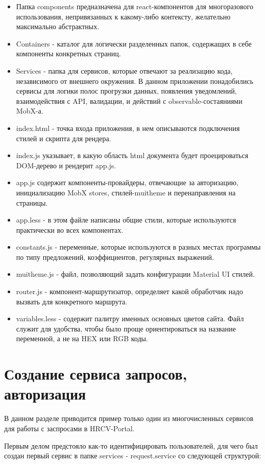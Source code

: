 \documentclass[12pt, a4paper]{diplom}
\begin{document}
\begin{itemize}
\item Папка components предназначена для react-компонентов для многоразового использования, непривязанных к какому-либо контексту, желательно максимально абстрактных.
\item Containers - каталог для логически разделенных папок, содержащих в себе компоненты конкретных страниц.
\item Services - папка для сервисов, которые отвечают за реализацию кода, независимого от внешнего окружения. В данном приложении понадобились сервисы для логики полос прогрузки данных, появления уведомлений, взаимодействия с API, валидации, и действий с observable-состаяниями MobX-а.
\item index.html - точка входа приложения, в нем описываются подключения стилей и скрипта для рендера.
\item index.js указывает, в какую область html документа будет проецироваться DOM-дерево и рендерит app.js.
\item app.js содержит компоненты-провайдеры, отвечающие за авторизацию, инициализацию MobX stores, стилей-muitheme и перенаправления на страницы.
\item app.less - в этом файле написаны общие стили, которые используются практически во всех компонентах.
\item constants.js - переменные, которые используются в разных местах программы по типу предложений, коэффициентов, регулярных выражений.
\item muitheme.js - файл, позволяющий задать конфигурации Material UI стилей.
\item router.js - компонент-маршрутизатор, определяет какой обработчик надо вызвать для конкретного маршрута.
\item variables.less - содержит палитру именных основных цветов сайта. Файл служит для удобства, чтобы было проще ориентироваться на название переменной, а не на HEX или RGB коды.
\end{itemize}

\section{Создание сервиса запросов, авторизация}

В данном разделе приводится пример только один из многочисленных сервисов для работы с заспросами в HRCV-Portal.

Первым делом предстояло как-то идентифицировать пользователей, для чего был создан первый сервис в папке services - request.service со следующей структурой:
\medskip
{}
\medskip
\end{document}
